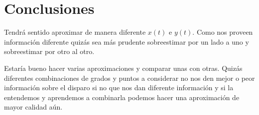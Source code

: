 \section{Conclusiones}

Tendrá sentido aproximar de manera diferente $x(t)$ e $y(t)$. Como nos proveen información diferente quizás sea más prudente sobreestimar por un
lado a uno y sobreestimar por otro al otro.

Estaría bueno hacer varias aproximaciones y comparar unas con otras. Quizás diferentes combinaciones de grados y puntos a considerar no 
nos den mejor o peor información sobre el disparo si no que nos dan diferente información y si la entendemos y aprendemos a combinarla
podemos hacer una aproximación de mayor calidad aún.